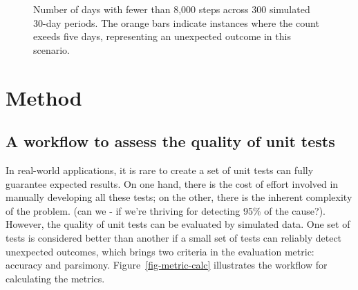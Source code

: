 \documentclass[
  12pt,
]{interact}
\begin{document}
\label{cell-fig-step-count}
\begin{figure}[H]


\caption{\label{fig-step-count}Number of days with fewer than 8,000
steps across 300 simulated 30-day periods. The orange bars indicate
instances where the count exeeds five days, representing an unexpected
outcome in this scenario.}

\end{figure}%

\section{Method}\label{sec-method}

\subsection{A workflow to assess the quality of unit
tests}\label{a-workflow-to-assess-the-quality-of-unit-tests}

In real-world applications, it is rare to create a set of unit tests can
fully guarantee expected results. On one hand, there is the cost of
effort involved in manually developing all these tests; on the other,
there is the inherent complexity of the problem. (can we - if we're
thriving for detecting 95\% of the cause?). However, the quality of unit
tests can be evaluated by simulated data. One set of tests is considered
better than another if a small set of tests can reliably detect
unexpected outcomes, which brings two criteria in the evaluation metric:
accuracy and parsimony. Figure~\ref{fig-metric-calc} illustrates the
workflow for calculating the metrics.
\end{document}
